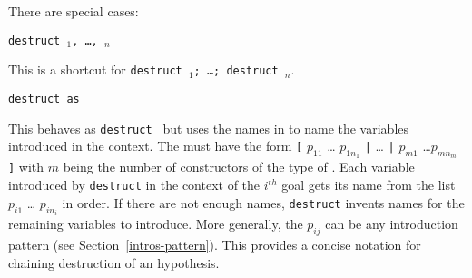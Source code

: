 \begin{coq_example*}
There are special cases:


\begin{Variants}
\item{\tt destruct \term$_1$, \ldots, \term$_n$}

  This is a shortcut for {\tt destruct \term$_1$; \ldots; destruct \term$_n$}.

\item{\tt destruct {\term} as {\disjconjintropattern}}

  This behaves as {\tt destruct {\term}} but uses the names in
  {\intropattern} to name the variables introduced in the context.
  The {\intropattern} must have the form {\tt [} $p_{11}$ \ldots
    $p_{1n_1}$ {\tt |} {\ldots} {\tt |} $p_{m1}$ \ldots $p_{mn_m}$
    {\tt ]} with $m$ being the number of constructors of the type of
  {\term}. Each variable introduced by {\tt destruct} in the context
  of the $i^{th}$ goal gets its name from the list $p_{i1}$ \ldots
  $p_{in_i}$ in order. If there are not enough names, {\tt destruct}
  invents names for the remaining variables to introduce. More
  generally, the $p_{ij}$ can be any introduction pattern (see
  Section~\ref{intros-pattern}). This provides a concise notation for
  chaining destruction of an hypothesis.



\end{Variants}
\end{coq_example*}

